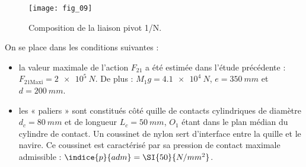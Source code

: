 \begin{figure}[!h]
\centering
\texttt{[image: fig\_09]}
\caption{Composition de la liaison pivot 1/N. \label{fig_09_quille}}
\end{figure}





On se place dans les conditions suivantes :
\begin{itemize}
\item la valeur maximale de l’action $F_{21}$ a été estimée dans l’étude précédente : $F_{21\text{Maxi}} = \SI{2e5}{N}$. De plus : $M_1 g = \SI{4,1e4}{N}$, $e = \SI{350}{mm}$ et $d = \SI{200}{mm}$.
\item les « paliers » sont constitués côté quille de contacts cylindriques de diamètre $d_c = \SI{80}{mm}$ et de longueur $L_c = \SI{50}{mm}$, $O_1$ étant dans le plan médian du cylindre de contact. Un coussinet de nylon sert d’interface entre la quille et le navire. Ce coussinet est caractérisé par sa pression de contact maximale admissible : $\indice{p}{adm} = \SI{50}{N/mm^2}$.
\end{itemize}





